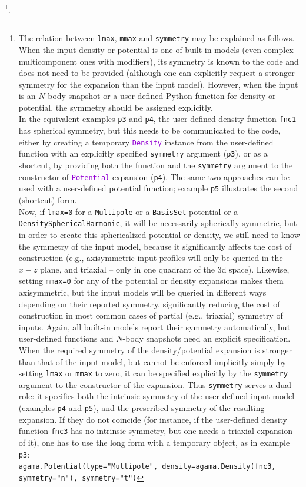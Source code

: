 \documentclass[12pt]{article}
\newcommand{\ttt}[1]{\textcolor{darkviolet}{\texttt{#1}}}
\newcommand{\ppp}[1]{\textcolor{darkolive} {\texttt{#1}}}
\begin{document}
\footnote{The relation between \ppp{lmax}, \ppp{mmax} and \ppp{symmetry} may be explained as follows. When the input density or potential is one of built-in models (even complex multicomponent ones with modifiers), its symmetry is known to the code and does not need to be provided (although one can explicitly request a stronger symmetry for the expansion than the input model). However, when the input is an $N$-body snapshot or a user-defined Python function for density or potential, the symmetry should be assigned explicitly.\\
In the equivalent examples \texttt{p3} and \texttt{p4}, the user-defined density function \texttt{fnc1} has spherical symmetry, but this needs to be communicated to the code, either by creating a temporary \ttt{Density} instance from the user-defined function with an explicitly specified \ppp{symmetry} argument (\texttt{p3}), or as a shortcut, by providing both the function and the \ppp{symmetry} argument to the constructor of \ttt{Potential} expansion (\texttt{p4}). The same two approaches can be used with a user-defined potential function; example \texttt{p5} illustrates the second (shortcut) form.\\
Now, if \ppp{lmax}\texttt{=0} for a \ppp{Multipole} or a \ppp{BasisSet} potential or a \ppp{DensitySphericalHarmonic}, it will be necessarily spherically symmetric, but in order to create this sphericalized potential or density, we still need to know the symmetry of the input model, because it significantly affects the cost of construction (e.g., axisymmetric input profiles will only be queried in the $x-z$ plane, and triaxial -- only in one quadrant of the 3d space). Likewise, setting \ppp{mmax}\texttt{=0} for any of the potential or density expansions makes them axisymmetric, but the input models will be queried in different ways depending on their reported symmetry, significantly reducing the cost of construction in most common cases of partial (e.g., triaxial) symmetry of inputs. Again, all built-in models report their symmetry automatically, but user-defined functions and $N$-body snapshots need an explicit specification.\\
When the required symmetry of the density/potential expansion is stronger than that of the input model, but cannot be enforced implicitly simply by setting \ppp{lmax} or \ppp{mmax} to zero, it can be specified explicitly by the \ppp{symmetry} argument to the constructor of the expansion. Thus \ppp{symmetry} serves a dual role: it specifies both the intrinsic symmetry of the user-defined input model (examples \texttt{p4} and \texttt{p5}), and the prescribed symmetry of the resulting expansion. If they do not coincide (for instance, if the user-defined density function \texttt{fnc3} has no intrinsic symmetry, but one needs a triaxial expansion of it), one has to use the long form with a temporary object, as in example \texttt{p3}:\\
\mbox{\texttt{agama.Potential(type="Multipole", density=agama.Density(fnc3, symmetry="n"), symmetry="t")}}}.\\
\end{document}
